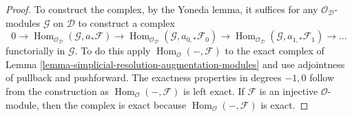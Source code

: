 \documentclass{stacks-project}
\theoremstyle{plain}
\theoremstyle{definition}
\theoremstyle{remark}
\numberwithin{equation}{subsection}
\def\Hom{\mathop{\mathrm{Hom}}\nolimits}
\begin{document}
\begin{proof}
To construct the complex, by the Yoneda lemma, it suffices for any
$\mathcal{O}_\mathcal{D}$-modules $\mathcal{G}$ on $\mathcal{D}$
to construct a complex
$$
0 \to \Hom_{\mathcal{O}_\mathcal{D}}(\mathcal{G}, a_*\mathcal{F}) \to
\Hom_{\mathcal{O}_\mathcal{D}}(\mathcal{G}, a_{0, *}\mathcal{F}_0) \to
\Hom_{\mathcal{O}_\mathcal{D}}(\mathcal{G}, a_{1, *}\mathcal{F}_1) \to \ldots
$$
functorially in $\mathcal{G}$. To do this apply
$\Hom_\mathcal{O}(-, \mathcal{F})$
to the exact complex of
Lemma \ref{lemma-simplicial-resolution-augmentation-modules}
and use adjointness of pullback and pushforward.
The exactness properties in degrees $-1, 0$ follow from
the construction as $\Hom_\mathcal{O}(-, \mathcal{F})$ is left exact.
If $\mathcal{F}$ is an injective $\mathcal{O}$-module, then the
complex is exact because $\Hom_\mathcal{O}(-, \mathcal{F})$ is exact.
\end{proof}
\end{document}
